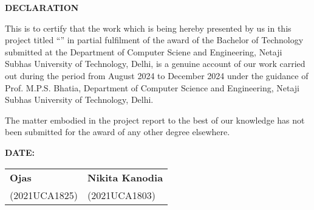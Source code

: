\thispagestyle{plain}
\begin{center}
\large \large \textbf{DECLARATION}
\end{center}

\vspace{0.3cm}
\fontsize{12pt}{24pt}\selectfont This is to certify that the work which is being hereby presented by us in this project titled “\textbf{\btptitle}” in partial fulfilment of the award of the Bachelor of Technology submitted at the Department of Computer Sciene and Engineering, Netaji Subhas University of Technology, Delhi, is a genuine account of our work carried out during the period from August 2024 to December 2024 under the guidance of Prof. M.P.S. Bhatia, Department of Computer Science and Engineering, Netaji Subhas University of Technology, Delhi.

The matter embodied in the project report to the best of our knowledge has not been submitted for the award of any other degree elsewhere.
\vspace{2.0cm}

\textbf{DATE: } \newline \newline \newline \newline

\begin{tabu} to \textwidth { X[l] X[c] }

 \textbf{Ojas} & \textbf{Nikita Kanodia} \\
 (2021UCA1825) & (2021UCA1803) \\
 

\end{tabu}


\newpage